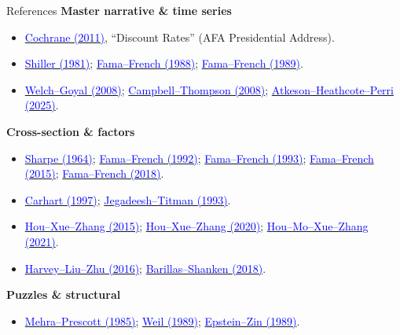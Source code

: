 \documentclass{beamer}
\begin{document}
\begin{frame}[allowframebreaks]{References}
\scriptsize
\textbf{Master narrative \& time series}
\begin{itemize}
  \item \href{https://doi.org/10.1111/j.1540-6261.2011.01671.x}{\textcolor{blue}{Cochrane (2011)}}, ``Discount Rates'' (AFA Presidential Address).
  \item \href{http://www.jstor.org/stable/1802789}{\textcolor{blue}{Shiller (1981)}}; \href{https://doi.org/10.1016/0304-405X(88)90020-7}{\textcolor{blue}{Fama--French (1988)}}; \href{https://doi.org/10.1016/0304-405X(89)90095-0}{\textcolor{blue}{Fama--French (1989)}}.
  \item \href{http://www.jstor.org/stable/40056859}{\textcolor{blue}{Welch--Goyal (2008)}}; \href{https://doi.org/10.1093/rfs/hhm055}{\textcolor{blue}{Campbell--Thompson (2008)}}; \href{https://www.nber.org/papers/w34923}{\textcolor{blue}{Atkeson--Heathcote--Perri (2025)}}.
\end{itemize}
\textbf{Cross-section \& factors}
\begin{itemize}
  \item \href{https://doi.org/10.1111/j.1540-6261.1964.tb02865.x}{\textcolor{blue}{Sharpe (1964)}}; \href{https://doi.org/10.1111/j.1540-6261.1992.tb04398.x}{\textcolor{blue}{Fama--French (1992)}}; \href{https://doi.org/10.1016/0304-405X(93)90023-5}{\textcolor{blue}{Fama--French (1993)}}; \href{https://doi.org/10.1016/j.jfineco.2014.10.010}{\textcolor{blue}{Fama--French (2015)}}; \href{https://doi.org/10.1016/j.jfineco.2018.02.012}{\textcolor{blue}{Fama--French (2018)}}.
  \item \href{https://doi.org/10.1111/j.1540-6261.1997.tb03808.x}{\textcolor{blue}{Carhart (1997)}}; \href{https://doi.org/10.1111/j.1540-6261.1993.tb04702.x}{\textcolor{blue}{Jegadeesh--Titman (1993)}}.
  \item \href{https://doi.org/10.1093/rfs/hhu068}{\textcolor{blue}{Hou--Xue--Zhang (2015)}}; \href{https://doi.org/10.1093/rfs/hhy131}{\textcolor{blue}{Hou--Xue--Zhang (2020)}}; \href{https://doi.org/10.1093/rof/rfaa004}{\textcolor{blue}{Hou--Mo--Xue--Zhang (2021)}}.
  \item \href{https://doi.org/10.1093/rfs/hhv059}{\textcolor{blue}{Harvey--Liu--Zhu (2016)}}; \href{https://doi.org/10.1111/jofi.12607}{\textcolor{blue}{Barillas--Shanken (2018)}}.
\end{itemize}
\textbf{Puzzles \& structural}
\begin{itemize}
  \item \href{https://doi.org/10.1016/0304-3932(85)90061-3}{\textcolor{blue}{Mehra--Prescott (1985)}}; \href{https://doi.org/10.1016/0304-3932(89)90028-7}{\textcolor{blue}{Weil (1989)}}; \href{https://doi.org/10.2307/1913778}{\textcolor{blue}{Epstein--Zin (1989)}}.

\end{itemize}
\end{frame}
\end{document}
